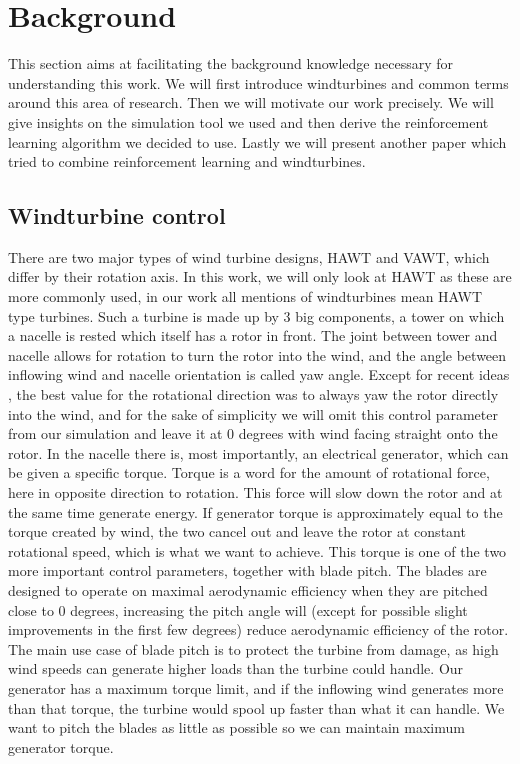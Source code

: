 \documentclass[hyperref,final,beleg]{cgvpub}
\begin{document}
\chapter{Background}

This section aims at facilitating the background knowledge necessary for understanding this work. We will first introduce windturbines and common terms around this area of research. Then we will motivate our work precisely. We will give insights on the simulation tool we used and then derive the reinforcement learning algorithm we decided to use. Lastly we will present another paper which tried to combine reinforcement learning and windturbines.

\section{Windturbine control}
There are two major types of wind turbine designs, \ac{HAWT} and \ac{VAWT}, which differ by their rotation axis. In this work, we will only look at \ac{HAWT} as these are more commonly used, in our work all mentions of windturbines mean \ac{HAWT} type turbines. Such a turbine is made up by 3 big components, a tower on which a nacelle is rested which itself has a rotor in front. 
The joint between tower and nacelle allows for rotation to turn the rotor into the wind, and the angle between inflowing wind and nacelle orientation is called yaw angle. Except for recent ideas \cite{howlandWindFarmPower2019}, the best value for the rotational direction was to always yaw the rotor directly into the wind, and for the sake of simplicity we will omit this control parameter from our simulation and leave it at 0 degrees with wind facing straight onto the rotor.
In the nacelle there is, most importantly, an electrical generator, which can be given a specific torque. Torque is a word for the amount of rotational force, here in opposite direction to rotation. This force will slow down the rotor and at the same time generate energy. If generator torque is approximately equal to the torque created by wind, the two cancel out and leave the rotor at constant rotational speed, which is what we want to achieve. This torque is one of the two more important control parameters, together with blade pitch. The blades are designed to operate on maximal aerodynamic efficiency when they are pitched close to 0 degrees, increasing the pitch angle will (except for possible slight improvements in the first few degrees) reduce aerodynamic efficiency of the rotor. The main use case of blade pitch is to protect the turbine from damage, as high wind speeds can generate higher loads than the turbine could handle. Our generator has a maximum torque limit, and if the inflowing wind generates more than that torque, the turbine would spool up faster than what it can handle. We want to pitch the blades as little as possible so we can maintain maximum generator torque.
\end{document}
